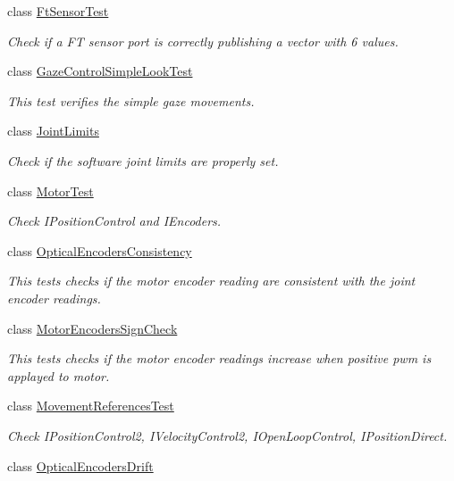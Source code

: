 \begin{DoxyCompactItemize}
class \hyperlink{classFtSensorTest}{Ft\+Sensor\+Test}
\begin{DoxyCompactList}\small\item\em Check if a FT sensor port is correctly publishing a vector with 6 values. \end{DoxyCompactList}\item 
class \hyperlink{classGazeControlSimpleLookTest}{Gaze\+Control\+Simple\+Look\+Test}
\begin{DoxyCompactList}\small\item\em This test verifies the simple gaze movements. \end{DoxyCompactList}\item 
class \hyperlink{classJointLimits}{Joint\+Limits}
\begin{DoxyCompactList}\small\item\em Check if the software joint limits are properly set. \end{DoxyCompactList}\item 
class \hyperlink{classMotorTest}{Motor\+Test}
\begin{DoxyCompactList}\small\item\em Check I\+Position\+Control and I\+Encoders. \end{DoxyCompactList}\item 
class \hyperlink{classOpticalEncodersConsistency}{Optical\+Encoders\+Consistency}
\begin{DoxyCompactList}\small\item\em This tests checks if the motor encoder reading are consistent with the joint encoder readings. \end{DoxyCompactList}\item 
class \hyperlink{classMotorEncodersSignCheck}{Motor\+Encoders\+Sign\+Check}
\begin{DoxyCompactList}\small\item\em This tests checks if the motor encoder readings increase when positive pwm is applayed to motor. \end{DoxyCompactList}\item 
class \hyperlink{classMovementReferencesTest}{Movement\+References\+Test}
\begin{DoxyCompactList}\small\item\em Check I\+Position\+Control2, I\+Velocity\+Control2, I\+Open\+Loop\+Control, I\+Position\+Direct. \end{DoxyCompactList}\item 
class \hyperlink{classOpticalEncodersDrift}{Optical\+Encoders\+Drift}

\end{DoxyCompactItemize}
